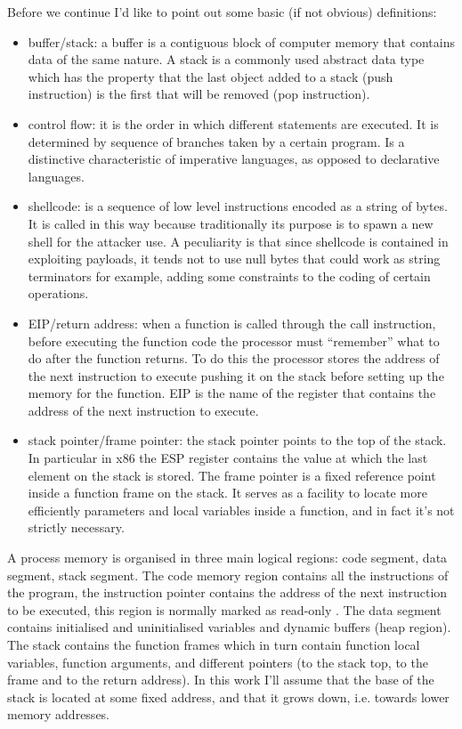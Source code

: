 \documentclass[Lau,binding=0.6cm]{sapthesis}
\begin{document}
Before we continue I’d like to point out some basic (if not obvious) definitions:
\begin{itemize}
\item
buffer/stack: a buffer is a contiguous block of computer memory that contains data of the same nature. A stack is a commonly used abstract data type which has the property that the last object added to a stack (push instruction) is the first that will be removed (pop instruction).
\item
control flow: it is the order in which different statements are executed. It is determined by sequence of branches taken by a certain program. Is a distinctive characteristic of imperative languages, as opposed to declarative languages.
\item
shellcode: is a sequence of low level instructions encoded as a string of bytes. It is called in this way because traditionally its purpose is to spawn a new shell for the attacker use. A peculiarity is that since shellcode is contained in exploiting payloads, it tends not to use null bytes that could work as string terminators for example, adding some constraints to the coding of certain operations. 
\item
EIP/return address: when a function is called through the call instruction, before executing the function code the processor must “remember” what to do after the function returns. To do this the processor stores the address of the next instruction to execute pushing it on the stack before setting up the memory for the function. EIP is the name of the register that contains the address of the next instruction to execute.
\item
stack pointer/frame pointer: the stack pointer points to the top of the stack. In particular in x86 the ESP register contains the value at which the last element on the stack is stored. The frame pointer is a fixed reference point inside a function frame on the stack. It serves as a facility to locate more efficiently parameters and local variables inside a function, and in fact it’s not strictly necessary.
\end{itemize}
A process memory is organised in three main logical regions: code segment, data segment, stack segment.
The code memory region contains all the instructions of the program, the instruction pointer contains the address of the next instruction to be executed, this region is normally marked as read-only . The data segment contains initialised and uninitialised variables and dynamic buffers (heap region). The stack contains the function frames which in turn contain function local variables, function arguments, and different pointers (to the stack top, to the frame and to the return address). In this work I’ll assume that the base of the stack is located at some fixed address, and that it grows down, i.e. towards lower memory addresses.
\end{document}
